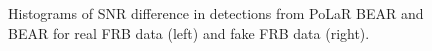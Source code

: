 \begin{figure}
\begin{minipage}{0.5\textwidth}
    \end{minipage}
    \caption[Histograms of SNR difference]{Histograms of SNR difference in detections from PoLaR BEAR and BEAR for real FRB data (left) and fake FRB data (right).}
    \label{fig:snrdiff}
\end{figure}